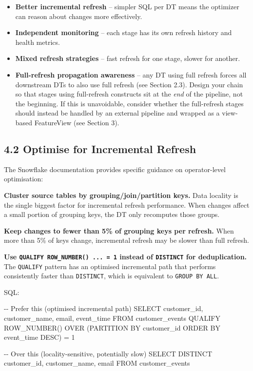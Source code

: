\documentclass[
  letterpaper,
  DIV=11,
  numbers=noendperiod]{scrreprt}
\newenvironment{Shaded}{\begin{snugshade}}{\end{snugshade}}
\newcommand{\CommentTok}[1]{\textcolor[rgb]{0.37,0.37,0.37}{#1}}
\newcommand{\DecValTok}[1]{\textcolor[rgb]{0.68,0.00,0.00}{#1}}
\newcommand{\FunctionTok}[1]{\textcolor[rgb]{0.28,0.35,0.67}{#1}}
\newcommand{\KeywordTok}[1]{\textcolor[rgb]{0.00,0.23,0.31}{#1}}
\newcommand{\NormalTok}[1]{\textcolor[rgb]{0.00,0.23,0.31}{#1}}
\newcommand{\OperatorTok}[1]{\textcolor[rgb]{0.37,0.37,0.37}{#1}}
\providecommand{\tightlist}{%
  \setlength{\itemsep}{0pt}\setlength{\parskip}{0pt}}\usepackage{longtable,booktabs,array}
\begin{document}
\begin{itemize}
\tightlist
\item
  \textbf{Better incremental refresh} -- simpler SQL per DT means the
  optimizer can reason about changes more effectively.
\item
  \textbf{Independent monitoring} -- each stage has its own refresh
  history and health metrics.
\item
  \textbf{Mixed refresh strategies} -- fast refresh for one stage,
  slower for another.
\item
  \textbf{Full-refresh propagation awareness} -- any DT using full
  refresh forces all downstream DTs to also use full refresh (see
  Section 2.3). Design your chain so that stages using full-refresh
  constructs sit at the \emph{end} of the pipeline, not the beginning.
  If this is unavoidable, consider whether the full-refresh stages
  should instead be handled by an external pipeline and wrapped as a
  view-based FeatureView (see Section 3).
\end{itemize}

\hypertarget{optimise-for-incremental-refresh}{%
\subsection{4.2 Optimise for Incremental
Refresh}\label{optimise-for-incremental-refresh}}

The Snowflake documentation provides specific guidance on operator-level
optimisation:

\textbf{Cluster source tables by grouping/join/partition keys.} Data
locality is the single biggest factor for incremental refresh
performance. When changes affect a small portion of grouping keys, the
DT only recomputes those groups.

\textbf{Keep changes to fewer than 5\% of grouping keys per refresh.}
When more than 5\% of keys change, incremental refresh may be slower
than full refresh.

\textbf{Use \texttt{QUALIFY\ ROW\_NUMBER()\ ...\ =\ 1} instead of
\texttt{DISTINCT} for deduplication.} The \texttt{QUALIFY} pattern has
an optimised incremental path that performs consistently faster than
\texttt{DISTINCT}, which is equivalent to \texttt{GROUP\ BY\ ALL}.

SQL:

\begin{Shaded}
\begin{Highlighting}[]
\CommentTok{{-}{-} Prefer this (optimised incremental path)}
\KeywordTok{SELECT}\NormalTok{ customer\_id, customer\_name, email, event\_time}
\KeywordTok{FROM}\NormalTok{ customer\_events}
\NormalTok{QUALIFY }\FunctionTok{ROW\_NUMBER}\NormalTok{() }\KeywordTok{OVER}\NormalTok{ (}\KeywordTok{PARTITION} \KeywordTok{BY}\NormalTok{ customer\_id }\KeywordTok{ORDER} \KeywordTok{BY}\NormalTok{ event\_time }\KeywordTok{DESC}\NormalTok{) }\OperatorTok{=} \DecValTok{1}

\CommentTok{{-}{-} Over this (locality{-}sensitive, potentially slow)}
\KeywordTok{SELECT} \KeywordTok{DISTINCT}\NormalTok{ customer\_id, customer\_name, email}
\KeywordTok{FROM}\NormalTok{ customer\_events}
\end{Highlighting}
\end{Shaded}
\end{document}
